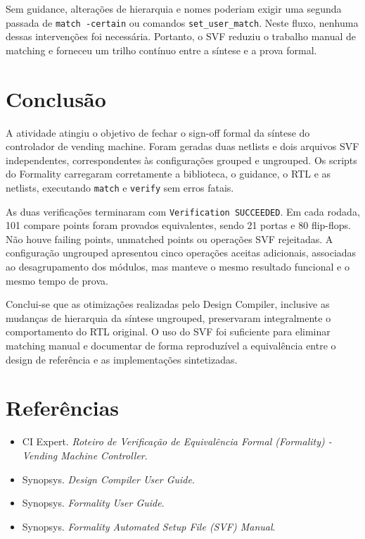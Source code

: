 \documentclass[11pt,a4paper]{article}
\begin{document}
Sem guidance, alterações de hierarquia e nomes poderiam exigir uma segunda passada de \texttt{match -certain} ou comandos \texttt{set\_user\_match}. Neste fluxo, nenhuma dessas intervenções foi necessária. Portanto, o SVF reduziu o trabalho manual de matching e forneceu um trilho contínuo entre a síntese e a prova formal.

\section{Conclusão}

A atividade atingiu o objetivo de fechar o sign-off formal da síntese do controlador de vending machine. Foram geradas duas netlists e dois arquivos SVF independentes, correspondentes às configurações grouped e ungrouped. Os scripts do Formality carregaram corretamente a biblioteca, o guidance, o RTL e as netlists, executando \texttt{match} e \texttt{verify} sem erros fatais.

As duas verificações terminaram com \texttt{Verification SUCCEEDED}. Em cada rodada, 101 compare points foram provados equivalentes, sendo 21 portas e 80 flip-flops. Não houve failing points, unmatched points ou operações SVF rejeitadas. A configuração ungrouped apresentou cinco operações aceitas adicionais, associadas ao desagrupamento dos módulos, mas manteve o mesmo resultado funcional e o mesmo tempo de prova.

Conclui-se que as otimizações realizadas pelo Design Compiler, inclusive as mudanças de hierarquia da síntese ungrouped, preservaram integralmente o comportamento do RTL original. O uso do SVF foi suficiente para eliminar matching manual e documentar de forma reproduzível a equivalência entre o design de referência e as implementações sintetizadas.

\section{Referências}

\begin{itemize}[leftmargin=1.2cm,itemsep=2pt]
    \item CI Expert. \textit{Roteiro de Verificação de Equivalência Formal (Formality) - Vending Machine Controller}.
    \item Synopsys. \textit{Design Compiler User Guide}.
    \item Synopsys. \textit{Formality User Guide}.
    \item Synopsys. \textit{Formality Automated Setup File (SVF) Manual}.
\end{itemize}
\end{document}
